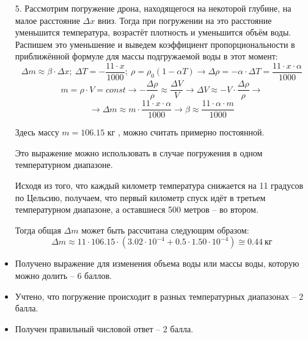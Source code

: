 \begin{enumerate}
    \item[5.] Рассмотрим погружение дрона, находящегося на 
    некоторой глубине, на малое расстояние $\Delta x$ вниз. 
    Тогда при погружении на это расстояние уменьшится 
    температура, возрастёт плотность и уменьшится объём воды. 
    Распишем это уменьшение и выведем коэффициент 
    пропорциональности в приближённой формуле для массы 
    подгружаемой воды в этот момент:
    $$\Delta m \approx \beta \cdot \Delta x; \:  \Delta T=-\frac{11\cdot x}{1000}; \: \rho=\rho_0 (1-\alpha T)  \rightarrow \Delta \rho=-\alpha \cdot \Delta T=\frac{11\cdot x\cdot \alpha}{1000}$$
    $$m=\rho\cdot V=const  \rightarrow  -\frac{\Delta \rho}{\rho} \approx \frac{\Delta V}{V} \rightarrow  \Delta V \approx -V\cdot \frac{\Delta \rho}{\rho} \rightarrow $$
    $$\rightarrow \Delta m \approx m\cdot \frac{11\cdot x\cdot \alpha}{1000} \rightarrow \beta  \approx \frac{11\cdot \alpha \cdot m}{1000}$$
    
    Здесь массу  $m=106.15$ кг , можно считать примерно постоянной. 
    
    Это выражение можно использовать в случае погружения в одном температурном диапазоне.
    
    Исходя из того, что каждый километр температура снижается на 11 градусов по Цельсию, получаем, что первый километр спуск идёт в третьем температурном диапазоне, а оставшиеся 500 метров – во втором.
    
    Тогда общая $\Delta m$ может быть рассчитана следующим образом:
    $$\Delta m \approx 11\cdot 106.15 \cdot (3.02\cdot 10^{-4}+0.5\cdot 1.50\cdot 10^{-4} ) \cong 0.44 \: \text{кг}$$
    
\end{enumerate}

\additionalCriteria

\begin{itemize}
    \item Получено выражение для изменения объема воды или массы воды, которую можно долить – 6 баллов.
    \item Учтено, что погружение происходит в разных температурных диапазонах – 2 балла.
    \item Получен правильный числовой ответ – 2 балла.
\end{itemize}